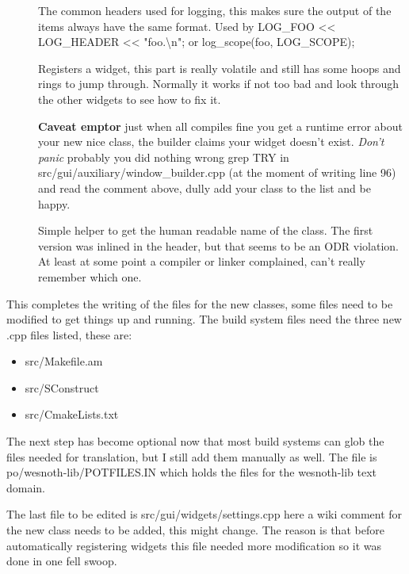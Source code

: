 \begin{description}
\begin{description}
\begin{description}
	\item[]
		The common headers used for logging, this makes sure the output of the
		items always have the same format. Used by
		LOG\_FOO \textless\textless{} LOG\_HEADER \textless\textless{} "foo.\textbackslash{}n"; or
		log\_scope(foo, LOG\_SCOPE); %

	\item[]
		Registers a widget, this part is really volatile and still has some
		hoops and rings to jump through. Normally it works if not too bad and
		look through the other widgets to see how to fix it. 

		\textbf{Caveat emptor} just when all compiles fine you get a runtime
		error about your new nice class, the builder claims your widget doesn't
		exist. \emph{Don't panic} probably you did nothing wrong grep TRY in
		src/gui/auxiliary/window\_builder.cpp (at the moment of writing line 96)
		and read the comment above, dully add your class to the list and be
		happy.

	\item[]
		Simple helper to get the human readable name of the class. The first
		version was inlined in the header, but that seems to be an ODR
		violation. At least at some point a compiler or linker complained, can't
		really remember which one. %

	\end{description}
\end{description}

This completes the writing of the files for the new classes, some files need to
be modified to get things up and running. The build system files need the three
new .cpp files listed, these are:
\begin{itemize}
\item src/Makefile.am
\item src/SConstruct
\item src/CmakeLists.txt
\end{itemize}

The next step has become optional now that most build systems can glob the files
needed for translation, but I still add them manually as well. The file is 
po/wesnoth-lib/POTFILES.IN which holds the files for the wesnoth-lib text
domain.

The last file to be edited is src/gui/widgets/settings.cpp here a wiki comment
for the new class needs to be added, this might change. The reason is that
before automatically registering widgets this file needed more modification so
it was done in one fell swoop.

\end{description}

